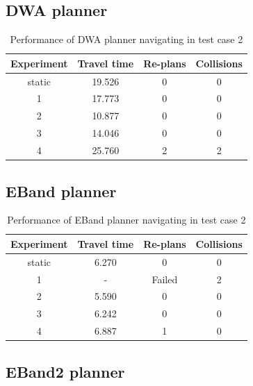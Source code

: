 \subsection{DWA planner}%
\label{sub:eval_dwa_planner_tc2}

\begin{table}[H]
    \centering
    \begin{tabular}{cccc}
        \textbf{Experiment} & \textbf{Travel time} & \textbf{Re-plans} & \textbf{Collisions} \\\toprule
        static & 19.526 & 0 & 0 \\
             1 & 17.773 & 0 & 0 \\
             2 & 10.877 & 0 & 0 \\
             3 & 14.046 & 0 & 0 \\
             4 & 25.760 & 2 & 2 \\
    \end{tabular}
    \caption{Performance of DWA planner navigating in test case 2}\label{tab:perfomance_dwa_test_case_2}
\end{table}

\subsection{EBand planner}%
\label{sub:eval_eband_planner_tc2}

\begin{table}[H]
    \centering
    \begin{tabular}{cccc}
        \textbf{Experiment} & \textbf{Travel time} & \textbf{Re-plans} & \textbf{Collisions} \\\toprule
        static & 6.270 & 0 & 0 \\
             1 & \-- & Failed & 2 \\
             2 & 5.590 & 0 & 0 \\
             3 & 6.242 & 0 & 0 \\
             4 & 6.887 & 1 & 0 \\
    \end{tabular}
    \caption{Performance of EBand planner navigating in test case 2}\label{tab:perfomance_eband_test_case_2}
\end{table}


\subsection{EBand2 planner}%
\label{sub:eval_eband2_planner_tc2}

